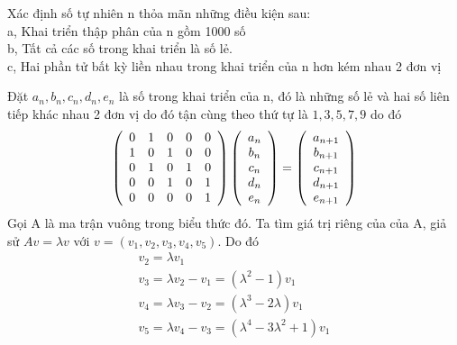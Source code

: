 \begin{baitap}
Xác định số tự nhiên n thỏa mãn những điều kiện sau:\\
a, Khai triển thập phân của n gồm 1000 số \\
b, Tất cả các số trong khai triển là số lẻ.\\
c, Hai phần tử bất kỳ liền nhau trong khai triển của n hơn kém nhau 2 đơn vị

\begin{loigiai1}
Đặt $a_n ,b_n ,c_n ,d_n ,e_n $ là số trong khai triển của n, đó là những số lẻ và hai số liên tiếp khác nhau 2 đơn vị do đó tận cùng theo thứ tự là $1,3,5,7,9$ do đó 
\[
\left( {\begin{array}{*{20}c}
   0 & 1 & 0 & 0 & 0 \\
   1 & 0 & 1 & 0 &0 \\
   0 & 1 & 0 & 1 &0  \\
   0 & 0 & 1 & 0 &1 \\
   0 & 0 & 0 & 0 &1 \\
\end{array}} \right)\left( {\begin{array}{*{20}c}
   {a_n }  \\
   {b_n }  \\
   {c_n }  \\
   {d_n }  \\
   {e_n }  \\
\end{array}} \right) = \left( {\begin{array}{*{20}c}
   {a_{n + 1} }  \\
   {b_{n + 1} }  \\
   {c_{n + 1} }  \\
   {d_{n + 1} }  \\
   {e_{n + 1} }  \\
\end{array}} \right)
\]
Gọi A là ma trận vuông trong biểu thức đó. Ta tìm giá trị riêng của của A, giả sử $Av = \lambda v$ với $v = \left( {v_1 ,v_2 ,v_3 ,v_4 ,v_5 } \right)$. Do đó 
\[
\begin{array}{l}
 v_2  = \lambda v_1  \\ 
 v_3  = \lambda v_2  - v_1  = \left( {\lambda ^2  - 1} \right)v_1  \\ 
 v_4  = \lambda v_3  - v_2  = \left( {\lambda ^3  - 2\lambda } \right)v_1  \\ 
 v_5  = \lambda v_4  - v_3  = \left( {\lambda ^4  - 3\lambda ^2  + 1} \right)v_1  \\ 
 \end{array}
\]
\end{loigiai1}
\end{baitap}
